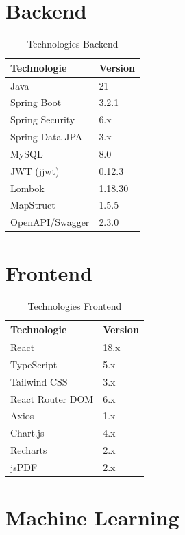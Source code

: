 \documentclass[12pt,a4paper]{report}
\begin{document}
\section{Backend}

\begin{table}[H]
    \centering
    \begin{tabular}{ll}
        \toprule
        \textbf{Technologie} & \textbf{Version} \\
        \midrule
        Java & 21 \\
        Spring Boot & 3.2.1 \\
        Spring Security & 6.x \\
        Spring Data JPA & 3.x \\
        MySQL & 8.0 \\
        JWT (jjwt) & 0.12.3 \\
        Lombok & 1.18.30 \\
        MapStruct & 1.5.5 \\
        OpenAPI/Swagger & 2.3.0 \\
        \bottomrule
    \end{tabular}
    \caption{Technologies Backend}
\end{table}

\section{Frontend}

\begin{table}[H]
    \centering
    \begin{tabular}{ll}
        \toprule
        \textbf{Technologie} & \textbf{Version} \\
        \midrule
        React & 18.x \\
        TypeScript & 5.x \\
        Tailwind CSS & 3.x \\
        React Router DOM & 6.x \\
        Axios & 1.x \\
        Chart.js & 4.x \\
        Recharts & 2.x \\
        jsPDF & 2.x \\
        \bottomrule
    \end{tabular}
    \caption{Technologies Frontend}
\end{table}

\section{Machine Learning}
\end{document}
